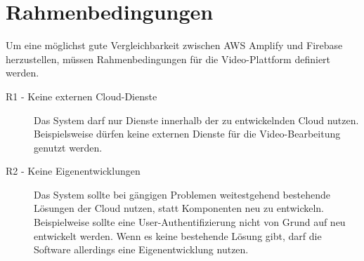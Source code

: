 \section{Rahmenbedingungen}

Um eine möglichst gute Vergleichbarkeit zwischen AWS Amplify und Firebase herzustellen, müssen Rahmenbedingungen für die Video-Plattform definiert werden.

\begin{description}
   \item[R1 - Keine externen Cloud-Dienste] Das System darf nur Dienste innerhalb der zu entwickelnden Cloud nutzen. Beispielsweise dürfen keine externen Dienste für die Video-Bearbeitung genutzt werden.
   \item[R2 - Keine Eigenentwicklungen] Das System sollte bei gängigen Problemen weitestgehend bestehende Lösungen der Cloud nutzen, statt Komponenten neu zu entwickeln. Beispielweise sollte eine User-Authentifizierung nicht von Grund auf neu entwickelt werden. Wenn es keine bestehende Lösung gibt, darf die Software allerdings eine Eigenentwicklung nutzen.
\end{description}